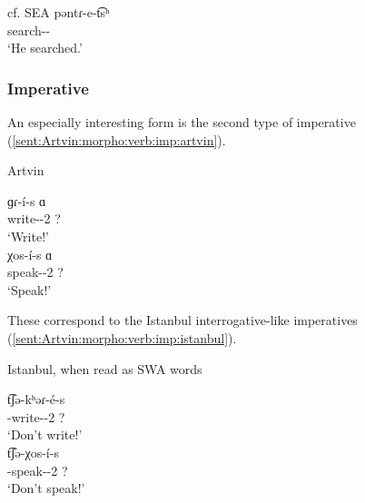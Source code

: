 
\begin{exe}
	\ex cf. SEA \label{sent:Artvin:morpho:verb:theme:search:SEA}
	\gll pəntɾ-e-t͡sʰ \\
	search-{\thgloss}-{\aor} \\
	\trans `He searched.' \\
\end{exe}

\subsubsection{Imperative}

An especially interesting form is the second type of imperative (\ref{sent:Artvin:morpho:verb:imp:artvin}).

\begin{exe}
	\ex Artvin \label{sent:Artvin:morpho:verb:imp:artvin}
	\begin{xlist}
		\ex \gll ɡɾ-\'i-s ɑ \\
		write-{\thgloss}-2{\sg} ? \\
		\trans `Write!' \\
		\ex \gll χos-\'i-s ɑ \\
		speak-{\thgloss}-2{\sg} ? \\
		\trans `Speak!' \\
	\end{xlist}
\end{exe}

These correspond to the Istanbul interrogative-like imperatives (\ref{sent:Artvin:morpho:verb:imp:istanbul}). 


\begin{exe}
	\ex Istanbul, when read as SWA words \label{sent:Artvin:morpho:verb:imp:istanbul}
	\begin{xlist}
		\ex \gll t͡ʃə-kʰəɾ-\'e-s \\
		{\neggloss}-write-{\thgloss}-2{\sg} ? \\
		\trans `Don't write!' \\
		\armenian{չգրե՞ս}
		\ex \gll t͡ʃə-χos-\'i-s \\
		{\neggloss}-speak-{\thgloss}-2{\sg} ? \\
		\trans `Don't speak!' \\
		\armenian{չխօսի՞ս} 
	\end{xlist}
\end{exe}



